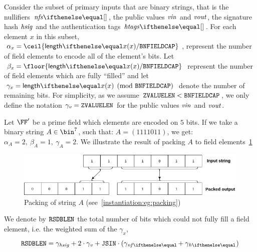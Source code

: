 Consider the subset of primary inputs that are binary strings, that is the nullifiers $\nfs{}$, the public values $\mathit{vin}$ and $\mathit{vout}$, the signature hash $\mathit{hsig}$ and the authentication tags $\htags{}$.
For each element $x$ in this subset, $\alpha_x = \ceil {\len{x} / \bnFieldBitCap}$, represent the number of field elements to encode all of the element's bits. Let $\beta_x = \floor{\len{x} / \bnFieldBitCap}$ represent the number of field elements which are fully ``filled'' and let $\gamma_x = \len{x} \pmod{\bnFieldBitCap}$ denote the number of remaining bits. For simplicity, as we assume $\mathtt{ZVALUELEN} < \mathtt{BNFIELDCAP}$, we only define the notation $\gamma_{\mathit{v}} = \mathtt{ZVALUELEN}$ for the public values $\mathit{vin}$ and $\mathit{vout}$.

\begin{example}\label{instantiation:eg:packing}
    Let $\FF'$ be a prime field which elements are encoded on $5$ bits.
%
    If we take a binary string $A \in \bin^7$, such that: $A = (1111011)$, we get: $\alpha_A = 2,\ \beta_A = 1,\ \gamma_A = 2$.
    We illustrate the result of packing $A$ to field elements~\cref{instantiation:fig:packingA}
\end{example}

\begin{figure}[ht]
    \centering
    \includegraphics[width=1\textwidth]{images/bit-packing-stringA.png}
    \caption{Packing of string $A$ (see~\cref{instantiation:eg:packing})}\label{instantiation:fig:packingA}
\end{figure}

We denote by $\mathtt{RSDBLEN}$ the total number of bits which could not fully fill a field element, i.e. the weighted sum of the $\gamma_x$,
\[
    \resBitsBLen = \gamma_\hsig + 2 \cdot \gamma_\notev + \jsin \cdot (\gamma_{\nf{}} + \gamma_{\htag{}} )
\]

